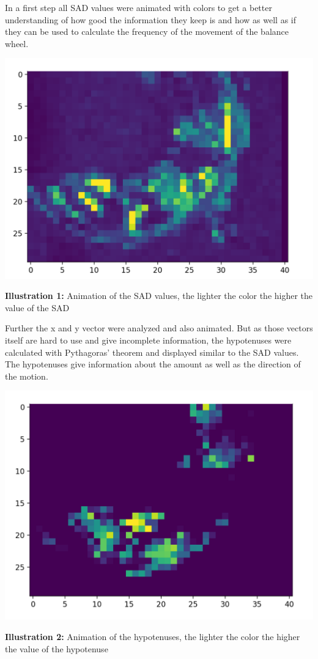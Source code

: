 \documentclass[12pt, a4paper]{report}
\begin{document}
In a first step all SAD values were animated with colors to get a better understanding of how good the information they keep is and how as well as if they can be used to calculate the frequency of the movement of the balance wheel.

\bigskip

\noindent
\begin{center}
\includegraphics[scale=0.6]{Images/animation_sad.png}

{\bf Illustration 1:}  Animation of the SAD values, the lighter the color the higher the value of the SAD
\end{center}

\bigskip
 
Further the x and y vector were analyzed and also animated. But as those vectors itself are hard to use and give incomplete information, the hypotenuses were calculated with Pythagoras' theorem and displayed similar to the SAD values. The hypotenuses give information about the amount as well as the direction of the motion.
 
 \bigskip

\noindent
\begin{center}
\includegraphics[scale=0.6]{Images/animation_hypotenuse.png}

{\bf Illustration 2:}  Animation of the hypotenuses, the lighter the color the higher the value of the hypotenuse
\end{center}
\end{document}
